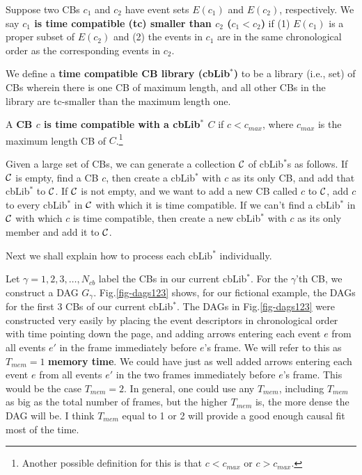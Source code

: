 \documentclass[12pt]{article}
\begin{document}
Suppose two CBs $c_1$ and $c_2$
have event sets $E(c_1)$ and $E(c_2)$,
respectively. 
We say {\bf $c_1$ is time compatible (tc) smaller than $c_2$ ($c_1 < c_2$)}
if (1) $E(c_1)$ is a proper subset of $E(c_2)$
and (2) the events in $c_1$
are in the same 
chronological order as the corresponding
events in $c_2$.

We define a {\bf time compatible CB library (cbLib$^*$)}
to be a library (i.e., set) of CBs wherein
there is one CB of maximum
length, and all other CBs in the library are tc-smaller
than the maximum length one.

A {\bf CB $c$
is time compatible
with a cbLib$^*$ $C$}
 if 
 $c<c_{max}$, where $c_{max}$ is the
 maximum length CB of $C$.\footnote{Another possible definition for this
 is that $c<c_{max}$ or $c>c_{max}$.}

Given a large set of CBs,
we can generate a collection ${\cal C}$
of cbLib$^*$s as follows.
If ${\cal C}$ is empty, find a CB $c$,
then create a cbLib$^*$ 
with $c$ as its only CB,
and add that cbLib$^*$ to
${\cal C}$.
If ${\cal C}$ is not empty,
and we want to add a new CB called $c$ to
${\cal C}$,
add $c$ to every cbLib$^*$ in
 ${\cal C}$ with which it is time compatible.
 If we can't find a cbLib$^*$ in ${\cal C}$
 with which $c$ is time compatible, then
 create a new cbLib$^*$ with $c$
 as its only member
 and add it to ${\cal C}$.
 
 Next we shall explain 
 how to process each cbLib$^*$ 
 individually.

Let 
$\gamma=1,2, 3, \ldots, N_{cb}$
label the CBs in
our current cbLib$^*$.
For the $\gamma$'th 
CB, we construct
a DAG  $G_\gamma$.
Fig.\ref{fig-dags123}
shows,
for our
fictional example, the DAGs for
the first 3 CBs of our
current cbLib$^*$.
The DAGs in 
Fig.\ref{fig-dags123}
were constructed
very easily by
placing the event
descriptors 
in chronological order
with time
pointing down the page,
and adding arrows 
entering each event $e$
from all events $e'$
in the frame immediately before
$e$'s frame.
We will refer to 
this as $T_{mem}=1$ {\bf memory time}.
We could have
just as well 
added arrows entering each event $e$
from all events $e'$
in the two frames 
immediately before 
$e$'s frame.
This would be the case $T_{mem}=2$.
In general,
one could use any $T_{mem}$,
including  $T_{mem}$
as big as the total number 
of frames,
but the higher $T_{mem}$
is, the more dense the DAG will be.
I think $T_{mem}$ 
equal to 1 or 2 will
provide a good enough causal fit
most of the time.
\end{document}
